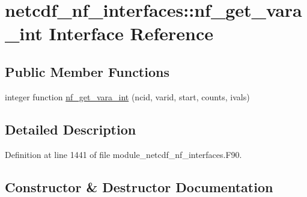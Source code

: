 \hypertarget{interfacenetcdf__nf__interfaces_1_1nf__get__vara__int}{}\section{netcdf\+\_\+nf\+\_\+interfaces\+:\+:nf\+\_\+get\+\_\+vara\+\_\+int Interface Reference}
\label{interfacenetcdf__nf__interfaces_1_1nf__get__vara__int}
\subsection*{Public Member Functions}
\begin{DoxyCompactItemize}
\item 
integer function \hyperlink{interfacenetcdf__nf__interfaces_1_1nf__get__vara__int_a164b94a922b1651dbca3eaf7fa0bd43e}{nf\+\_\+get\+\_\+vara\+\_\+int} (ncid, varid, start, counts, ivals)
\end{DoxyCompactItemize}


\subsection{Detailed Description}


Definition at line 1441 of file module\+\_\+netcdf\+\_\+nf\+\_\+interfaces.\+F90.



\subsection{Constructor \& Destructor Documentation}
\mbox{\label{interfacenetcdf__nf__interfaces_1_1nf__get__vara__int_a164b94a922b1651dbca3eaf7fa0bd43e}} 

